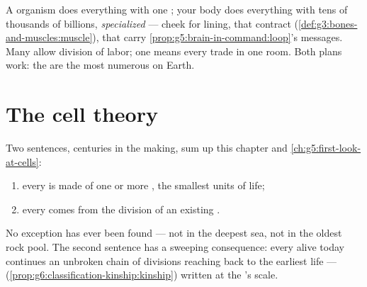 \begin{remark}\label{rem:g6:cell-unit-of-life:twoways}
A  organism does everything with one ; your
body does everything with tens of thousands of billions,
\emph{specialized} --- cheek  for lining,  
that contract (\cref{def:g3:bones-and-muscles:muscle}),
  that carry
\cref{prop:g5:brain-in-command:loop}'s messages. Many 
allow division of labor; one  means every trade in one
room. Both plans work: the  are the most
numerous  on Earth.
\end{remark}

\section{The cell theory}

\begin{proposition}\label{prop:g6:cell-unit-of-life:theory}
Two sentences, centuries in the making, sum up this
chapter and \cref{ch:g5:first-look-at-cells}:
\begin{enumerate}
  \item every  is made of one or more ,
        the smallest units of life;
  \item every  comes from the division of an existing
        .
\end{enumerate}
No exception has ever been found --- not in the deepest
sea, not in the oldest rock pool. The second sentence has a
sweeping consequence: every  alive today continues an
unbroken chain of divisions reaching back to the earliest
life ---  (\cref{prop:g6:classification-kinship:kinship})
written at the 's scale.
\end{proposition}
\admitted

